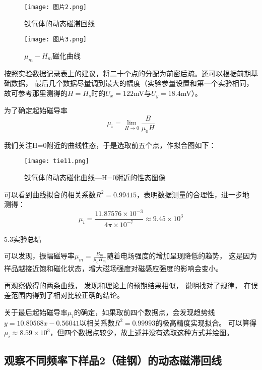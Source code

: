 \documentclass[11pt]{article}
\begin{document}
\begin{figure}[H]
    \centering
    \texttt{[image: 图片2.png]}
    \caption{铁氧体的动态磁滞回线}
\end{figure}

\begin{figure}[H]
    \centering
    \texttt{[image: 图片3.png]}
    \caption{$\mu_m-H_m$磁化曲线}
\end{figure}

按照实验数据记录表上的建议，将二十个点的分配为前密后疏。还可以根据前期基础数据，
最后几个数据尽量调到最大的幅度（实验参量设置和第一个实验相同，
故可参考那里测得的$H=H_s$时的$U_x=122$mV与$U_y=18.4$mV）。

为了确定起始磁导率$$\displaystyle \mu_i=\lim_{H\to 0}\frac{B}{\mu_0 H}$$
 
我们关注H=0附近的曲线性态，于是选取前五个点，作拟合图如下：

\begin{figure}[H]
    \centering
    \texttt{[image: tie11.png]}
    \caption{铁氧体的动态磁化曲线—H=0附近的性态图像}
\end{figure}

可以看到曲线拟合的相关系数$R^2=0.99415$，表明数据测量的合理性，进一步地
测得：
\begin{displaymath}\mu_i=\frac {11.87576\times 10^{-3}}{4\pi \times 10^{-7}}\approx 9.45 \times 10^3\end{displaymath}

\begin{center}
    \large{5.3实验总结}
\end{center}

可以发现，振幅磁导率$\mu_m=\frac{B_m}{\mu_0H_m}$随着电场强度的增加呈现降低的趋势，
这是因为样品越接近饱和磁化状态，增大磁场强度对磁感应强度的影响会变小。

再观察做得的两条曲线，
发现和理论上的预期结果相似，
说明找对了规律，
在误差范围内得到了相对比较正确的结论。

关于最后起始磁导率$\mu_i$的确定，如果取前四个数据点，会发现趋势线$y=10.80568x-0.56041$以相关系数$R^2=0.99993$的极高精度实现拟合。
可以算得$\mu_i\approx 8.59\times 10^{3}$，但四个数据点较少，故上述并没有选取这种方式并绘图。






\subsection{观察不同频率下样品2（硅钢）的动态磁滞回线}
\end{document}
